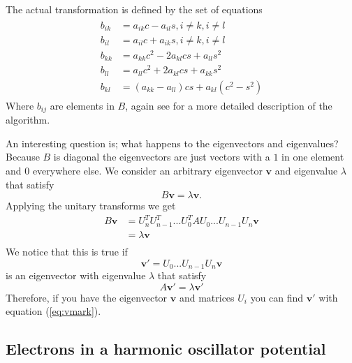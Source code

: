\documentclass[reprint,english,notitlepage,nofootinbib]{revtex4-1}  %
\begin{document}
The actual transformation is defined by the set of equations
\begin{align}
\begin{split}
	b_{ik} &= a_{ik}c - a_{il}s, i \neq k, i \neq l \\
	b_{il} &= a_{il}c + a_{ik}s, i \neq k, i \neq l \\
	b_{kk} &= a_{kk}c^2 - 2a_{kl}cs + a_{ll}s^2 \\
	b_{ll} &= a_{ll}c^2 + 2a_{kl}cs + a_{kk}s^2 \\
	b_{kl} &= (a_{kk} - a_{ll} )cs + a_{kl}(c^2 - s^2)
	\label{eq:jacobi}
\end{split}
\end{align}
Where $b_{ij}$ are elements in $B$, again see \citep{lecnotes} for a more detailed description of the algorithm.

An interesting question is; what happens to the eigenvectors and eigenvalues? Because $B$ is diagonal the eigenvectors are just vectors with a $1$ in one element and $0$ everywhere else. We consider an arbitrary eigenvector $\mathbf{v}$ and eigenvalue $\lambda$ that satisfy
\begin{equation*}
	B\mathbf{v} = \lambda \mathbf{v} .
\end{equation*}
Applying the unitary transforms we get
\begin{align*}
	B\mathbf{v} &= U_n^T U_{n-1}^T ... U_0^T A U_0 ... U_{n-1}U_n \mathbf{v} \\
	&= \lambda \mathbf{v} \\
 \end{align*}
We notice that this is true if
\begin{equation}
	\mathbf{v'} = U_0 ... U_{n-1}U_n \mathbf{v}
	\label{eq:vmark}
\end{equation}
is an eigenvector with eigenvalue $\lambda$ that satisfy
\begin{equation*}
	A \mathbf{v}' = \lambda \mathbf{v}'
\end{equation*}
Therefore, if you have the eigenvector $\mathbf{v}$ and matrices $U_i$ you can find $\mathbf{v}'$ with equation (\ref{eq:vmark}).

\subsection{Electrons in a harmonic oscillator potential}
\end{document}
